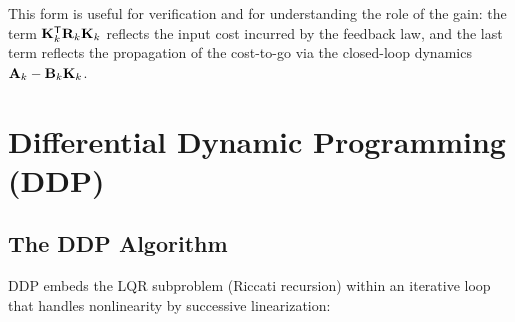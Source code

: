 This form is useful for verification and for understanding the role of the gain: the term $\mathbf{K}_k^{\mathsf{T}}\mathbf{R}_k\mathbf{K}_k$
reflects the input cost incurred by the feedback law, and the last term reflects the propagation of the
cost-to-go via the closed-loop dynamics $\mathbf{A}_k - \mathbf{B}_k\mathbf{K}_k$.

\section{Differential Dynamic Programming (DDP)}

\subsection{The DDP Algorithm}

DDP embeds the LQR subproblem (Riccati recursion) within an iterative loop that handles nonlinearity by
successive linearization:

